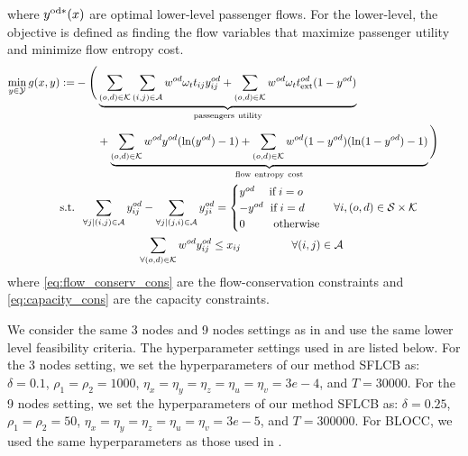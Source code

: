 \documentclass{article}
\theoremstyle{plain}
\theoremstyle{definition}
\theoremstyle{remark}
\begin{document}
where $y^{\rm od*}(x)$ are optimal lower-level passenger flows.
For the lower-level, the objective is defined as finding the flow variables that maximize passenger utility and minimize flow entropy cost.
\begin{align}\label{eq:LowerLevelObjectiveTransportation}
    \min_{y \in \mathcal{Y}} g(x,y):= & -\Bigg( \underbrace{\sum_{(o,d) \in \mathcal{K}}\sum_{(i,j) \in \mathcal{A}} w^{od}\omega_tt_{ij}y_{ij}^{od} + \sum_{(o,d) \in \mathcal{K}} w^{od}\omega_tt_{\rm ext}^{od} (1-y^{od})}_{\rm passengers~ utility}  \\ 
      & \qquad + \underbrace{\sum_{(o,d) \in \mathcal{K}} w^{od}y^{od}(\ln (y^{od}) - 1)  +  \sum_{(o,d) \in \mathcal{K}} w^{od}(1-y^{od})(\ln (1 - y^{od} ) - 1)}_{\rm flow~ entropy~cost}\Bigg) \nonumber \\ \label{eq:flow_conserv_cons}
           \qquad\qquad \text{s.t.}&\;\; \sum_{\forall j | (i,j) \in \mathcal{A}}y_{ij}^{od} - \sum_{\forall j | (j,i) \in \mathcal{A}}y_{ji}^{od} = 
     \begin{cases}
         y^{od} \;\quad \text{if} \; i=o \\ -y^{od} \;\ \text{if} \; i = d \\ 0 \;\;\qquad \text{otherwise}
     \end{cases}\forall i,(o,d) \in \mathcal{S} \times \mathcal{K} &&
     \\ \label{eq:capacity_cons}
     & \qquad\qquad\;\;\;\;\;\;\sum_{\forall (o,d) \in \mathcal{K}}w^{od}y_{ij}^{od} \leq x_{ij} \qquad\qquad\;\; \forall (i,j) \in \mathcal{A} &&
\end{align}
where \eqref{eq:flow_conserv_cons} are the flow-conservation constraints and \eqref{eq:capacity_cons} are the capacity constraints.

We consider the same 3 nodes and 9 nodes settings as in \cite{jiang2024primal} and use the same lower level feasibility criteria. The hyperparameter settings used in  are listed below. For the 3 nodes setting, we set the hyperparameters of our method SFLCB as: $\delta=0.1$, $\rho_1=\rho_2=1000$, $\eta_x=\eta_y=\eta_z=\eta_u=\eta_v=3e-4$, and $T=30000$. For the 9 nodes setting, we set the hyperparameters of our method SFLCB as: $\delta=0.25$, $\rho_1=\rho_2=50$, $\eta_x=\eta_y=\eta_z=\eta_u=\eta_v=3e-5$, and $T=300000$.  For BLOCC, we used the same hyperparameters as those used in \cite{jiang2024primal}.
\end{document}
